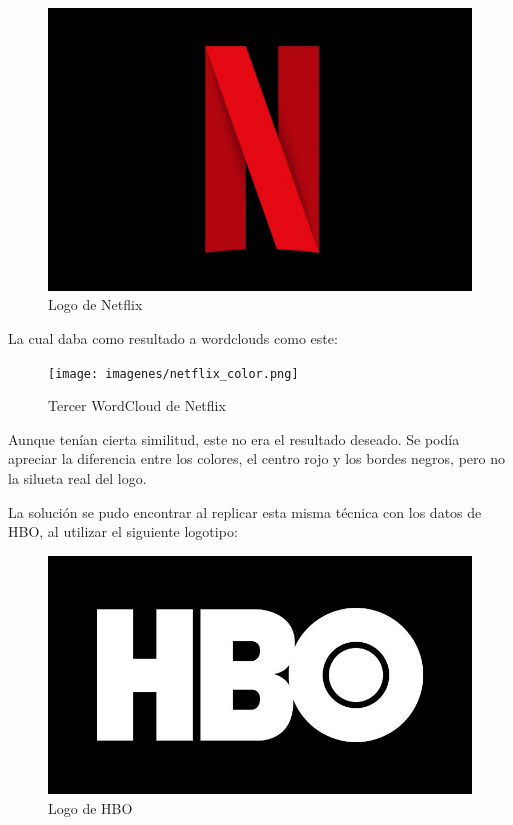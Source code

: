 \begin{figure}[H]
	\centering
	\includegraphics[scale=.2]{imagenes/netflix.jpg}
	\caption{Logo de Netflix}
	\label{fig:logonetflix}
\end{figure} 

La cual daba como resultado a wordclouds como este: 

\begin{figure}[H]
	\centering
	\texttt{[image: imagenes/netflix\_color.png]}
	\caption{Tercer WordCloud de Netflix}
	\label{fig:wordcloudNetflix3}
\end{figure} 

Aunque tenían cierta similitud, este no era el resultado deseado. Se podía apreciar la diferencia entre los colores, el centro rojo y los bordes negros, pero no la silueta real del logo. 

La solución se pudo encontrar al replicar esta misma técnica con los datos de HBO, al utilizar el siguiente logotipo: 



\begin{figure}[H]
	\centering
	\includegraphics[scale=.35]{imagenes/logohbo.jpg}
	\caption{Logo de HBO}
	\label{fig:logohbo}
\end{figure} 

